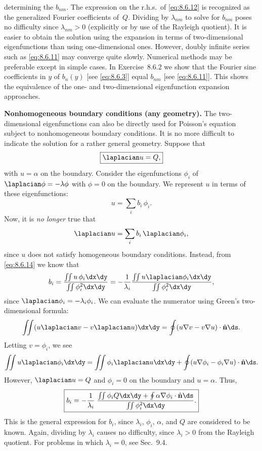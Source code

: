determining the $b_{nm}$.  The expression on the r.h.s.\ of \eqref{eq:8.6.12} is recognized as the generalized Fourier coefficients of~$Q$.  Dividing by $\lambda_{nm}$ to solve for $b_{nm}$ poses no difficulty since $\lambda_{nm} > 0$ (explicitly or by use of the Rayleigh quotient).  It is easier to obtain the solution using the expansion in terms of two-dimensional eigenfunctions than using one-dimensional ones.  However, doubly infinite series such as \eqref{eq:8.6.11} may converge quite slowly.  Numerical methods may be preferable except in simple cases.  In Exercise~8.6.2 we show that the Fourier sine coefficients in $y$ of $b_n(y)$ [see \eqref{eq:8.6.3}] equal $b_{nm}$ [see \eqref{eq:8.6.11}].  This shows the equivalence of the one- and two-dimensional eigenfunction expansion approaches.

\textbf{Nonhomogeneous boundary conditions (any geometry).}
The two-dimensional eigenfunctions can also be directly used for Poisson's equation subject to nonhomogeneous boundary conditions.  It is no more difficult to indicate the solution for a rather general geometry.  Suppose that
\begin{equation}
\label{eq:8.6.13}
\boxed{\laplacian u = Q,}
\end{equation}
with $u=\alpha$ on the boundary.  Consider the eigenfunctions $\phi_i$ of $\laplacian\phi = -\lambda\phi$ with $\phi = 0$ on the boundary.  We represent $u$ in terms of these eigenfunctions:
\begin{equation}
\label{eq:8.6.14}
\boxed{u = \sum_i b_i\,\phi_i.}
\end{equation}
Now, it is \emph{no longer} true that
\[
\laplacian u = \sum_i b_i\,\laplacian\phi_i,
\]
since $u$ does not satisfy homogeneous boundary conditions.  Instead, from \eqref{eq:8.6.14} we know that
\begin{equation}
\label{eq:8.6.15}
b_i = \frac{\iint u\,\phi_i\dx\dy}{\iint \phi_i^2\dx\dy}
= -\frac{1}{\lambda_i}\frac{\iint u\laplacian\phi_i\dx\dy}{\iint \phi_i^2\dx\dy},
\end{equation}
since $\laplacian\phi_i = -\lambda_i\phi_i$.  We can evaluate the numerator using Green's two-dimensional formula:
\begin{equation}
\label{eq:8.6.16}
\iint (u\laplacian v - v\laplacian u)\dx\dy = \oint (u\nabla v - v\nabla u)\cdot\hat{\mathbf{n}}\ds.
\end{equation}
Letting $v = \phi_i$, we see
\[
\iint u\laplacian\phi_i\dx\dy = \iint \phi_i\laplacian u\dx\dy + \oint (u\nabla\phi_i - \phi_i\nabla u)\cdot\hat{\mathbf{n}}\ds.
\]
However, $\laplacian u = Q$ and $\phi_i = 0$ on the boundary and $u = \alpha$.  Thus,
\begin{equation}
\label{eq:8.6.17}
\boxed{b_i = -\frac{1}{\lambda_i}\;\frac{\iint \phi_i Q\dx\dy + \oint \alpha\nabla\phi_i\cdot\hat{\mathbf{n}}\ds}{\iint \phi_i^2\dx\dy}.}
\end{equation}
This is the general expression for $b_i$, since $\lambda_i$, $\phi_i$, $\alpha$, and $Q$ are considered to be known.  Again, dividing by $\lambda_i$ causes no difficulty, since $\lambda_i > 0$ from the Rayleigh quotient.  For problems in which $\lambda_i = 0$, see Sec.~9.4.

